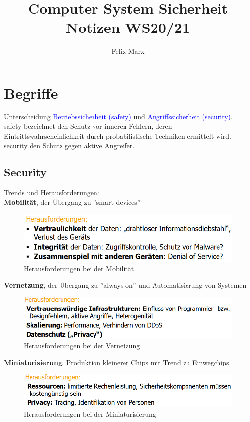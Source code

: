 \documentclass[a4paper,12pt,leqno]{article}
\title{Computer System Sicherheit\\Notizen WS20/21}
\author{Felix Marx}
\newcommand{\blue}[1]{\textcolor{blue}{#1}}
\begin{document}
\maketitle

{
\hypersetup{linkcolor=black}
\tableofcontents
}
\newpage

\section{Begriffe}
Unterscheidung \blue{Betriebssicherheit (safety)} und \blue{Angriffssicherheit (security)}.\\
safety bezeichnet den Schutz vor inneren Fehlern, deren Eintrittswahrscheinlichkeit durch probabilistische Techniken ermittelt wird.\\
security den Schutz gegen aktive Angreifer.

\subsection{Security}

Trends und Herausforderungen:\\
\textbf{Mobilität}, der Übergang zu ''smart devices''
\begin{figure}[h!]
\centering
\includegraphics[scale=0.6]{Grafiken/Trend-Mobilitaet.png}
\caption{Herausforderungen bei der Mobilität}
\end{figure}

\textbf{Vernetzung}, der Übergang zu ''always on'' und Automatisierung von Systemen
\begin{figure}[h!]
\centering
\includegraphics[scale=0.6]{Grafiken/Trend-Vernetzung.png}
\caption{Herausforderungen bei der Vernetzung}
\end{figure}

\textbf{Miniaturisierung}, Produktion kleinerer Chips mit Trend zu Einwegchips
\begin{figure}[h!]
\centering
\includegraphics[scale=0.6]{Grafiken/Trend-Miniaturisierung.png}
\caption{Herausforderungen bei der Miniaturisierung}
\end{figure}\\
\end{document}

